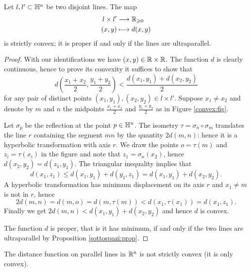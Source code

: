 \begin{prop} \label{distanza:convessa:prop}
Let $l,l'\subset \mathbb{H}^n$ be two disjoint lines. The map
\begin{align*}
l \times l' & \longrightarrow \mathbb{R}_{\geqslant 0} \\
(x,y) & \longmapsto d(x, y)
\end{align*}
is strictly convex; it is proper if and only if the lines are ultraparallel. 
\end{prop}
\begin{proof}
With our identifications we have $(x,y) \in \mathbb{R} \times \mathbb{R}$. The function $d$ is clearly continuous, hence to prove its convexity it suffices to show that  
$$d\left(\frac{x_1+x_2}2, \frac{y_1+y_2}2\right) < \frac{d(x_1,y_1) + d(x_2,y_2)}2$$
for any pair of distinct points $(x_1,y_1), (x_2,y_2) \in l\times l'$. Suppose $x_1\neq x_2$ and denote by $m$ and $n$ the midpoints $\frac{x_1+x_2}2$ and $\frac{y_1+y_2}2$ as in Figure \ref{convex:fig}. 

Let $\sigma_p$ be the reflection at the point $p\in\mathbb{H}^n$. The isometry $\tau = \sigma_n\circ \sigma_m$ translates the line $r$ containing the segment $mn$ by the quantity $2d(m,n)$: hence it is a hyperbolic transformation with axis $r$. We draw the points  $o = \tau(m)$ and $z_i = \tau(x_i)$ in the figure and note that $z_1 = \sigma_n(x_2)$, hence $d(x_2,y_2) = d(z_1,y_1)$. The triangular inequality implies that
$$d(x_1, z_1) \leqslant d(x_1,y_1) + d(y_1, z_1) = d(x_1,y_1) + d(x_2, y_2).$$
A hyperbolic transformation has minimum displacement on its axis $r$ and $x_1 \neq m$ is not in $r$, hence
$$2d(m,n) = d(m,o) = d(m,\tau(m)) < d(x_1, \tau(x_1)) = d(x_1,z_1).$$
Finally we get $2d(m,n) <  d(x_1,y_1) + d(x_2, y_2)$ and hence $d$ is convex. 

The function $d$ is proper, that is it has minimum, if and only if the two lines are ultraparallel by Proposition \ref{sottospazi:prop}.
\end{proof}

\begin{ex}
The distance function on parallel lines in $\mathbb{R}^n$ is not strictly convex (it is only convex).
\end{ex}

